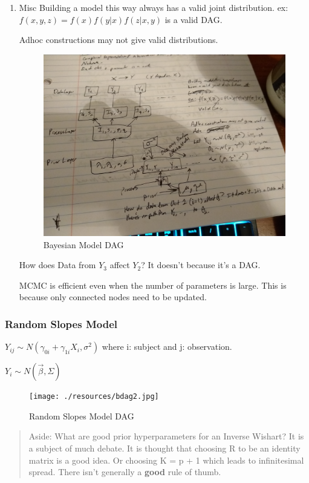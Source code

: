 \documentclass[11pt]{article}
\begin{document}
\begin{enumerate}
\item Misc
\label{sec:org59062e4}
Building a model this way always has a valid joint distribution. ex: \(f(x, y, z)
= f(x) f(y | x) f(z | x, y)\) is a valid DAG.

Adhoc constructions may not give valid distributions.

\begin{figure}[htbp]
\centering
\includegraphics[width=.9\linewidth]{./resources/bdag.jpeg}
\caption{\label{fig:bdag}Bayesian Model DAG}
\end{figure}


How does Data from \(Y_3\) affect \(Y_2\)? It doesn't because it's a DAG.

MCMC is efficient even when the number of parameters is large. This is because only connected nodes need to be updated.
\end{enumerate}

\subsubsection{Random Slopes Model}
\label{sec:org5a3c7f0}

\(Y_{ij} \sim N(\gamma_{0i} + \gamma_{1i} X_i, \sigma^2)\) where i: subject and j: observation.

\(Y_i \sim N(\vec \beta, \Sigma)\)

\begin{figure}[htbp]
\centering
\texttt{[image: ./resources/bdag2.jpg]}
\caption{\label{fig:label}Random Slopes Model DAG}
\end{figure}

\begin{quote}
Aside: What are good prior hyperparameters for an Inverse Wishart? It is a subject of much debate. It is thought that choosing R to be an identity matrix is a good idea.  Or choosing K = p + 1 which leads to infinitesimal spread. There isn't generally a \textbf{good} rule of thumb.
\end{quote}
\end{document}
